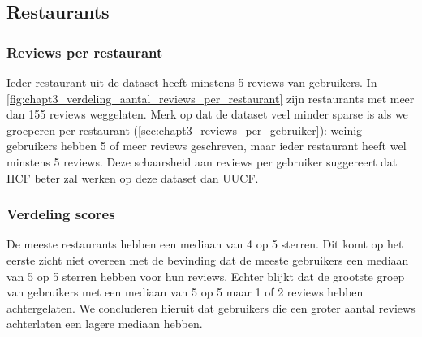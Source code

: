 \subsection{Restaurants}
\subsubsection{Reviews per restaurant}
Ieder restaurant uit de dataset heeft minstens 5 reviews van gebruikers. In \autoref{fig:chapt3_verdeling_aantal_reviews_per_restaurant} zijn restaurants met meer dan 155 reviews weggelaten. Merk op dat de dataset veel minder sparse is als we groeperen per restaurant (\ref{sec:chapt3_reviews_per_gebruiker}): weinig gebruikers hebben 5 of meer reviews geschreven, maar ieder restaurant heeft wel minstens 5 reviews. Deze schaarsheid aan reviews per gebruiker suggereert dat IICF beter zal werken op deze dataset dan UUCF. \cite{cursus_hs9}


\subsubsection{Verdeling scores}
De meeste restaurants hebben een mediaan van 4 op 5 sterren. Dit komt op het eerste zicht niet overeen met de bevinding dat de meeste gebruikers een mediaan van 5 op 5 sterren hebben voor hun reviews. Echter blijkt dat de grootste groep van gebruikers met een mediaan van 5 op 5 maar 1 of 2 reviews hebben achtergelaten. We concluderen hieruit dat gebruikers die een groter aantal reviews achterlaten een lagere mediaan hebben.

